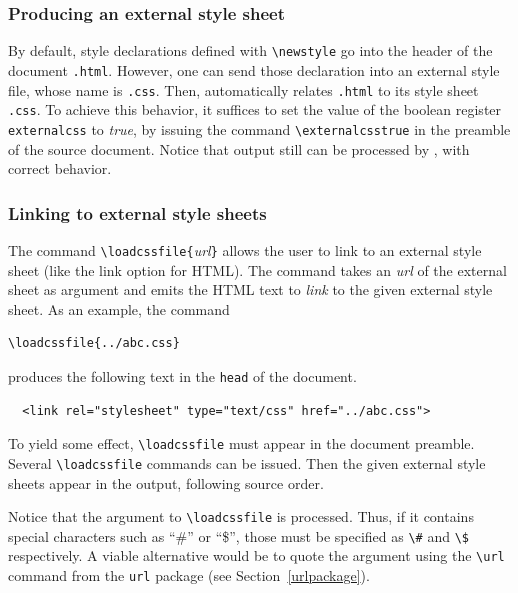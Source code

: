 \subsubsection{Producing an external style sheet}
%
%
By default,  style declarations defined with
\verb+\newstyle+ go into the header of the \html{} document
\texttt{.html}.
However, one can send those declaration into an external style file,
whose name is \texttt{.css}.
Then, \hevea{} automatically relates \texttt{.html} to
its style sheet  \texttt{.css}.
To achieve this behavior, it suffices to set the value of the boolean
register \texttt{externalcss} to \textit{true}, by issuing the command
\verb+\externalcsstrue+ in the preamble of the source document.
Notice that \hevea{} output still can be processed by \hacha{}, with
correct behavior.


\subsubsection{Linking to external style sheets}
%
%
The \hevea{} command \verb+\loadcssfile{+\textit{url}\verb+}+ allows the
user to link to an external style sheet (like the link option for
HTML). The command takes an \textit{url} of the external
sheet as argument and emits the HTML text to
\emph{link} to the given external style sheet. As an example, the command
\begin{verbatim}
\loadcssfile{../abc.css}
\end{verbatim}
produces the following \html{} text in the \verb+head+ of the document.
\begin{verbatim}
  <link rel="stylesheet" type="text/css" href="../abc.css">
\end{verbatim} 
To yield some effect, \verb+\loadcssfile+ must appear in the document
preamble.  Several \verb+\loadcssfile+ commands can be issued.  Then
the given external style sheets appear in the output, following source
order.

Notice that the argument to \verb+\loadcssfile+ is processed. Thus, if it
contains special characters such as ``\#'' or ``\$'', those must be specified
as \verb+\#+ and \verb+\$+ respectively.
A viable alternative would be to quote
the argument using the \verb+\url+ command from the \texttt{url}
package (see Section~\ref{urlpackage}).

